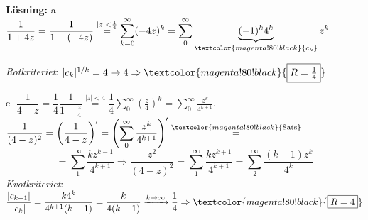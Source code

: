 \textbf{Lösning:} \textcircled{a} \quad $\dfrac{1}{1 + 4z} = \dfrac{1}{1 - (-4z)} \overset{|z| < \frac{1}{4}}{=} \displaystyle\sum_{k = 0}^\infty (-4z)^k = \sum_0^\infty \underbrace{(-1)^k 4^k}_{\textcolor{magenta!80!black}{c_k}} z^k$

\emph{Rotkriteriet}: $|c_k|^{1/k} = 4 \to 4 \Rightarrow \textcolor{magenta!80!black}{\boxed{R = \tfrac{1}{4}}}$

\textcircled{c} \quad $\dfrac{1}{4 - z} = \dfrac{1}{4} \dfrac{1}{1 - \frac{z}{4}} \overset{|z| < 4}{=} \dfrac{1}{4} \displaystyle\sum_0^\infty \left( \frac{z}{4} \right)^k = \sum_0^\infty \frac{z^k}{4^{k+1}}$. \quad $\dfrac{1}{(4 - z)^2} = \left( \dfrac{1}{4 - z} \right)' = \left( \displaystyle\sum_0^\infty \frac{z^k}{4^{k+1}} \right)' \overset{\textcolor{magenta!80!black}{\text{Sats}}}{=}$
\[ = \sum_1^\infty \frac{kz^{k-1}}{4^{k+1}} \Rightarrow \frac{z^2}{(4 - z)^2} = \sum_1^\infty \frac{kz^{k+1}}{4^{k+1}} = \sum_2^\infty \frac{(k - 1)z^k}{4^k} \]
\emph{Kvotkriteriet}: $\dfrac{|c_{k+1}|}{|c_k|} = \dfrac{k4^k}{4^{k+1}(k - 1)} = \dfrac{k}{4(k - 1)} \xrightarrow{k \to \infty} \dfrac{1}{4} \Rightarrow \textcolor{magenta!80!black}{\boxed{R = 4}}$
